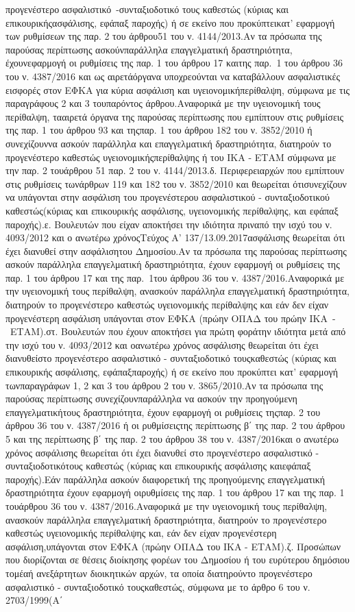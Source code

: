 \documentclass[a4paper,oneside, 10pt]{book}
\begin{document}
προγενέστερο ασφαλιστικό -συνταξιοδοτικό τους καθεστώς (κύριας και επικουρικήςασφάλισης, εφάπαξ παροχής) ή σε εκείνο που προκύπτεικατ’ εφαρμογή των ρυθμίσεων της παρ. 2 του άρθρου51 του ν. 4144/2013.Αν τα πρόσωπα της παρούσας περίπτωσης ασκούνπαράλληλα επαγγελματική δραστηριότητα, έχουνεφαρμογή οι ρυθμίσεις της παρ. 1 του άρθρου 17 καιτης παρ. 1 του άρθρου 36 του ν. 4387/2016 και ως αιρετάόργανα υποχρεούνται να καταβάλλουν ασφαλιστικές εισφορές στον ΕΦΚΑ για κύρια ασφάλιση και υγειονομικήπερίθαλψη, σύμφωνα με τις παραγράφους 2 και 3 τουπαρόντος άρθρου.Αναφορικά με την υγειονομική τους περίθαλψη, τααιρετά όργανα της παρούσας περίπτωσης που εμπίπτουν στις ρυθμίσεις της παρ. 1 του άρθρου 93 και τηςπαρ. 1 του άρθρου 182 του ν. 3852/2010 ή συνεχίζουννα ασκούν παράλληλα και επαγγελματική δραστηριότητα, διατηρούν το προγενέστερο καθεστώς υγειονομικήςπερίθαλψης ή του ΙΚΑ - ΕΤΑΜ σύμφωνα με την παρ. 2 τουάρθρου 51 παρ. 2 του ν. 4144/2013.δ. Περιφερειαρχών που εμπίπτουν στις ρυθμίσεις τωνάρθρων 119 και 182 του ν. 3852/2010 και θεωρείται ότισυνεχίζουν να υπάγονται στην ασφάλιση του προγενέστερου ασφαλιστικού - συνταξιοδοτικού καθεστώς(κύριας και επικουρικής ασφάλισης, υγειονομικής περίθαλψης, και εφάπαξ παροχής).ε. Βουλευτών που είχαν αποκτήσει την ιδιότητα πριναπό την ισχύ του ν. 4093/2012 και ο ανωτέρω χρόνοςΤεύχος Α’ 137/13.09.2017ασφάλισης θεωρείται ότι έχει διανυθεί στην ασφάλισητου Δημοσίου.Αν τα πρόσωπα της παρούσας περίπτωσης ασκούν παράλληλα επαγγελματική δραστηριότητα, έχουν εφαρμογή οι ρυθμίσεις της παρ. 1 του άρθρου 17 και της παρ. 1του άρθρου 36 του ν. 4387/2016.Αναφορικά με την υγειονομική τους περίθαλψη, ανασκούν παράλληλα επαγγελματική δραστηριότητα, διατηρούν το προγενέστερο καθεστώς υγειονομικής περίθαλψης και εάν δεν είχαν προγενέστερη ασφάλιση υπάγονται στον ΕΦΚΑ (πρώην ΟΠΑΔ του πρώην ΙΚΑ - ΕΤΑΜ).στ. Βουλευτών που έχουν αποκτήσει για πρώτη φοράτην ιδιότητα μετά από την ισχύ του ν. 4093/2012 και οανωτέρω χρόνος ασφάλισης θεωρείται ότι έχει διανυθείστο προγενέστερο ασφαλιστικό - συνταξιοδοτικό τουςκαθεστώς (κύριας και επικουρικής ασφάλισης, εφάπαξπαροχής) ή σε εκείνο που προκύπτει κατ’ εφαρμογή τωνπαραγράφων 1, 2 και 3 του άρθρου 2 του ν. 3865/2010.Αν τα πρόσωπα της παρούσας περίπτωσης συνεχίζουνπαράλληλα να ασκούν την προηγούμενη επαγγελματικήτους δραστηριότητα, έχουν εφαρμογή οι ρυθμίσεις τηςπαρ. 2 του άρθρου 36 του ν. 4387/2016 ή οι ρυθμίσειςτης περίπτωσης β΄ της παρ. 2 του άρθρου 5 και της περίπτωσης β΄ της παρ. 2 του άρθρου 38 του ν. 4387/2016και ο ανωτέρω χρόνος ασφάλισης θεωρείται ότι έχει διανυθεί στο προγενέστερο ασφαλιστικό - συνταξιοδοτικότους καθεστώς (κύριας και επικουρικής ασφάλισης καιεφάπαξ παροχής).Εάν παράλληλα ασκούν διαφορετική της προηγούμενης επαγγελματική δραστηριότητα έχουν εφαρμογή οιρυθμίσεις της παρ. 1 του άρθρου 17 και της παρ. 1 τουάρθρου 36 του ν. 4387/2016.Αναφορικά με την υγειονομική τους περίθαλψη, ανασκούν παράλληλα επαγγελματική δραστηριότητα, διατηρούν το προγενέστερο καθεστώς υγειονομικής περίθαλψης και, εάν δεν είχαν προγενέστερη ασφάλιση,υπάγονται στον ΕΦΚΑ (πρώην ΟΠΑΔ του ΙΚΑ - ΕΤΑΜ).ζ. Προσώπων που διορίζονται σε θέσεις διοίκησης φορέων του Δημοσίου ή του ευρύτερου δημόσιου τομέαή ανεξάρτητων διοικητικών αρχών, τα οποία διατηρούντο προγενέστερο ασφαλιστικό - συνταξιοδοτικό τουςκαθεστώς, σύμφωνα με το άρθρο 6 του ν. 2703/1999(Α΄ 
\end{document}
